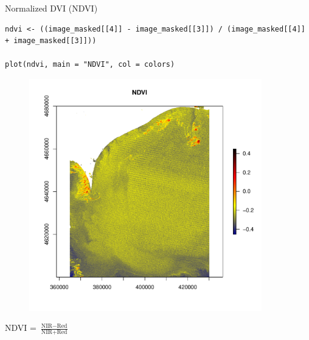 \documentclass[10pt]{beamer}
\begin{document}
\begin{frame}[fragile]{Normalized DVI (NDVI)}
\begin{lstlisting}[firstnumber = 43]
ndvi <- ((image_masked[[4]] - image_masked[[3]]) / (image_masked[[4]] + image_masked[[3]]))

plot(ndvi, main = "NDVI", col = colors)
\end{lstlisting}
\begin{minipage}{.6\textwidth}
\begin{figure}[ht]
\centering
\includegraphics[width=0.9\textwidth]{images/ndvi.pdf}
\end{figure}  
\end{minipage}
 \begin{minipage}[b]{.30\textwidth}
 \centering
\Large NDVI = \Large $\frac{\text{NIR} - \text{Red}}{\text{NIR} + \text{Red}}$  
 \end{minipage}
\end{frame}
\end{document}
